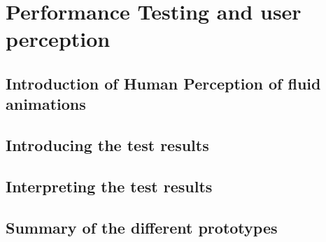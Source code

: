 \chapter{Performance Testing and user perception}
\label{chap:performance}

\section{Introduction of Human Perception of fluid animations}

\section{Introducing the test results}

\section{Interpreting the test results}

\section{Summary of the different prototypes}

